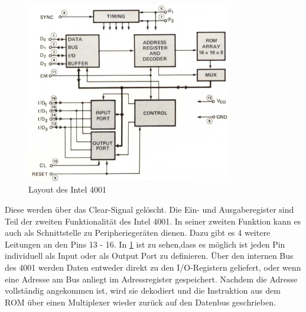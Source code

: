  \begin{figure}[h]
 	\centering
  	\includegraphics[width=0.8\textwidth]{figures/layout_4001.png}
  	\caption{Layout des Intel 4001}
  	\label{fig:layout_4001}
 \end{figure}
Diese werden über das Clear-Signal gelöscht. Die Ein- und Ausgaberegister sind Teil der zweiten Funktionalität des Intel 4001. In seiner zweiten Funktion kann es auch als Schnittstelle zu Peripheriegeräten dienen. Dazu gibt es 4 weitere Leitungen an den Pins 13 - 16. In \ref{fig:layout_4001} ist zu sehen,dass es möglich ist jeden Pin individuell als Input oder als Output Port zu definieren. Über den internen Bus des 4001 werden Daten entweder direkt zu den I/O-Registern geliefert, oder wenn eine Adresse am Bus anliegt im Adressregister gespeichert. Nachdem die Adresse vollständig angekommen ist, wird sie dekodiert und die Instruktion aus dem ROM über einen Multiplexer wieder zurück auf den Datenbus geschrieben.


